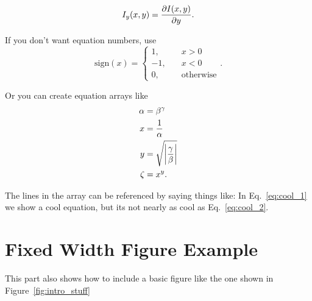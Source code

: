 \begin{equation}\label{eqn:definition_Iy}
I_y(x,y) = \pd{I(x,y)}{y}.
\end{equation}

If you don't want equation numbers, use
\[
\text{sign}(x) = \begin{cases}
                 1,  &\quad x> 0 \\
                 -1, &\quad x<0 \\
                 0,  &\quad \text{otherwise}
                 \end{cases}.
\]


 Or you can create equation arrays like
\begin{align}
  \alpha &= \beta^\gamma \notag \\
  x &= \frac{1}{\alpha} \label{eq:cool_1} \\
  y &= \sqrt{\abs{\frac{\gamma}{\beta}}} \notag \\
  \zeta &= x^y \label{eq:cool_2}.
\end{align}


The lines in the array can be referenced by saying things like: In
Eq.~\eqref{eq:cool_1} we show a cool equation, but its not nearly as
cool as Eq.~\eqref{eq:cool_2}.

\section{Fixed Width Figure Example} \label{sec:intro_figure_example}
This part also shows how to include a basic figure like the one
shown in Figure~\ref{fig:intro_stuff}

